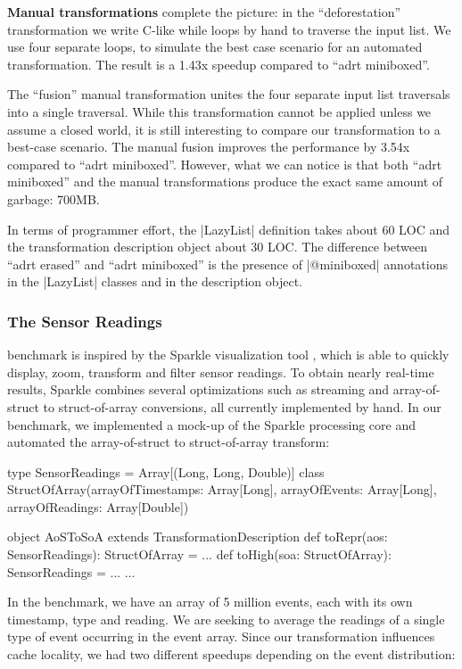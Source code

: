 \noindent
\textbf{Manual transformations} complete the picture: in the ``deforestation'' transformation we write C-like while loops by hand to traverse the input list. We use four separate loops, to simulate the best case scenario for an automated transformation. The result is a 1.43x speedup compared to ``adrt miniboxed''.

The ``fusion'' manual transformation unites the four separate input list traversals into a single traversal. While this transformation cannot be applied unless we assume a closed world, it is still interesting to compare our transformation to a best-case scenario. The manual fusion improves the performance by 3.54x compared to ``adrt miniboxed''. However, what we can notice is that both ``adrt miniboxed'' and the manual transformations produce the exact same amount of garbage: 700MB.

In terms of programmer effort, the |LazyList| definition takes about 60 LOC and the transformation description object about 30 LOC. The difference between ``adrt erased'' and ``adrt miniboxed'' is the presence of |@miniboxed| annotations in the |LazyList| classes and in the description object.

\subsubsection*{The Sensor Readings} benchmark is inspired by the Sparkle visualization tool \cite{sparkle}, which is able to quickly display, zoom, transform and filter sensor readings. To obtain nearly real-time results, Sparkle combines several optimizations such as streaming and array-of-struct to struct-of-array conversions, all currently implemented by hand. In our benchmark, we implemented a mock-up of the Sparkle processing core and automated the array-of-struct to struct-of-array transform:

\begin{lstlisting-nobreak}
type SensorReadings = Array[(Long, Long, Double)]
class StructOfArray(arrayOfTimestamps: Array[Long],
                           arrayOfEvents:     Array[Long],
                           arrayOfReadings:   Array[Double])

object AoSToSoA extends TransformationDescription {
  def toRepr(aos: SensorReadings): StructOfArray = ...
  def toHigh(soa: StructOfArray): SensorReadings = ...
  ...
}
\end{lstlisting-nobreak}

In the benchmark, we have an array of 5 million events, each with its own timestamp, type and reading. We are seeking to average the readings of a single type of event occurring in the event array. Since our transformation influences cache locality, we had two different speedups depending on the event distribution:

